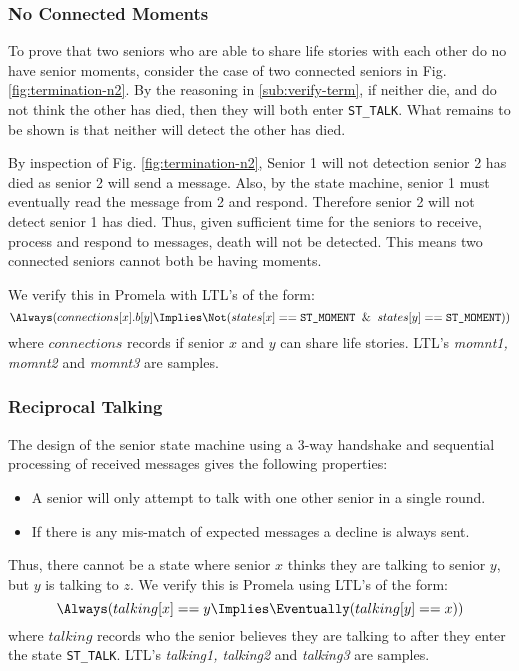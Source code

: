 \documentclass[12pt,a4paper]{scrartcl}
\begin{document}
\subsubsection{No Connected Moments}
To prove that two seniors who are able to share life stories with each other do no have senior moments,
    consider the case of two connected seniors in Fig. \ref{fig:termination-n2}.
By the reasoning in \ref{sub:verify-term}, if neither die, and do not think the other has died, then they will both enter \texttt{ST\_TALK}.
What remains to be shown is that neither will detect the other has died.

By inspection of Fig. \ref{fig:termination-n2}, Senior 1 will not detection senior 2 has died as senior 2 will send a message.
Also, by the state machine, senior 1 must eventually read the message from 2 and respond.
Therefore senior 2 will not detect senior 1 has died.
Thus, given sufficient time for the seniors to receive, process and respond to messages, death will not be detected.
This means two connected seniors cannot both be having moments.

We verify this in Promela with LTL's of the form:
\begin{equation}
    \Always(connections[x].b[y] \Implies \Not(states[x] == \texttt{ST\_MOMENT} \And states[y] == \texttt{ST\_MOMENT}))
\label{eq:ltl-moments}
\end{equation}
where $connections$ records if senior $x$ and $y$ can share life stories.
LTL's \emph{momnt1, momnt2} and \emph{momnt3} are samples.

\subsubsection{Reciprocal Talking}
The design of the senior state machine using a 3-way handshake and sequential processing of received messages gives the following properties:
\begin{itemize}
    \item A senior will only attempt to talk with one other senior in a single round.
    \item If there is any mis-match of expected messages a decline is always sent.
\end{itemize}

Thus, there cannot be a state where senior $x$ thinks they are talking to senior $y$, but $y$ is talking to $z$.
We verify this is Promela using LTL's of the form:
\begin{equation}
    \Always(talking[x] == y \Implies \Eventually(talking[y] == x))
\label{eq:ltl-recipricol}
\end{equation}
where $talking$ records who the senior believes they are talking to after they enter the state \texttt{ST\_TALK}.
LTL's \emph{talking1, talking2} and \emph{talking3} are samples.
\end{document}
